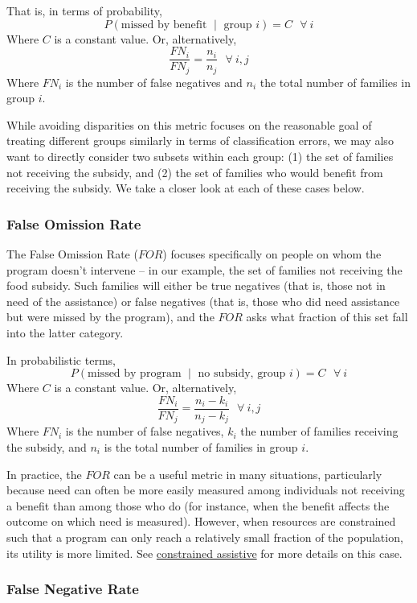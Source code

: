 \documentclass[]{krantz}
\begin{document}
That is, in terms of probability,
\[P(\textrm{missed by benefit $\mid$ group $i$}) = C~~~\forall~i\] Where
\(C\) is a constant value. Or, alternatively,
\[\frac{FN_i}{FN_j} = \frac{n_i}{n_j}~~~\forall~i,j\] Where \(FN_i\) is
the number of false negatives and \(n_i\) the total number of families
in group \(i\).

While avoiding disparities on this metric focuses on the reasonable goal
of treating different groups similarly in terms of classification
errors, we may also want to directly consider two subsets within each
group: (1) the set of families not receiving the subsidy, and (2) the
set of families who would benefit from receiving the subsidy. We take a
closer look at each of these cases below.

\subsubsection{False Omission Rate}\label{false-omission-rate}

The False Omission Rate (\(FOR\)) focuses specifically on people on whom
the program doesn't intervene -- in our example, the set of families not
receiving the food subsidy. Such families will either be true negatives
(that is, those not in need of the assistance) or false negatives (that
is, those who did need assistance but were missed by the program), and
the \(FOR\) asks what fraction of this set fall into the latter
category.

In probabilistic terms,
\[P(\textrm{missed by program $\mid$ no subsidy, group $i$}) = C~~~\forall~i\]
Where \(C\) is a constant value. Or, alternatively,
\[\frac{FN_i}{FN_j} = \frac{n_i-k_i}{n_j-k_j}~~~\forall~i,j\] Where
\(FN_i\) is the number of false negatives, \(k_i\) the number of
families receiving the subsidy, and \(n_i\) is the total number of
families in group \(i\).

In practice, the \(FOR\) can be a useful metric in many situations,
particularly because need can often be more easily measured among
individuals not receiving a benefit than among those who do (for
instance, when the benefit affects the outcome on which need is
measured). However, when resources are constrained such that a program
can only reach a relatively small fraction of the population, its
utility is more limited. See
\protect\hyperlink{sec:constrainedassistive}{constrained assistive} for
more details on this case.

\subsubsection{False Negative Rate}\label{false-negative-rate}
\end{document}
